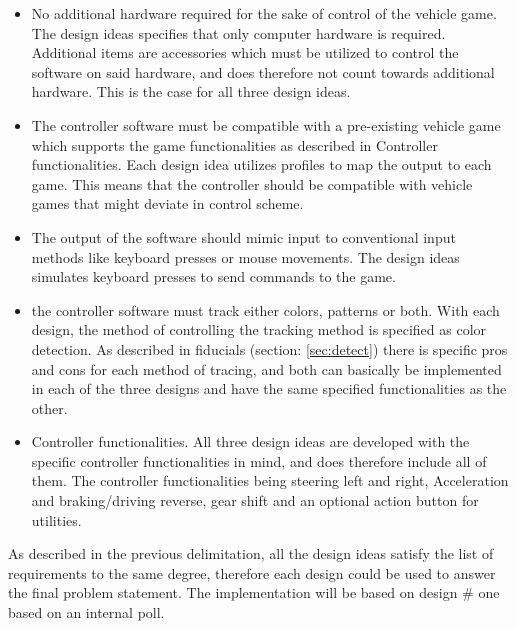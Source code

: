 \begin{itemize}
\item No additional hardware required for the sake of control of the vehicle game.\newline
The design ideas specifies that only computer hardware is required. Additional items are accessories which must be utilized to control the software on said hardware, and does therefore not count towards additional hardware. This is the case for all three design ideas.

\item The controller software must be compatible with a pre-existing vehicle game which supports
the game functionalities as described in Controller functionalities.\newline
Each design idea utilizes profiles to map the output to each game. This means that the controller should be compatible with vehicle games that might deviate in control scheme.

\item The output of the software should mimic input to conventional input methods like keyboard
presses or mouse movements.\newline
The design ideas simulates keyboard presses to send commands to the game. 

\item the controller software must track either colors, patterns or both.\newline
With each design, the method of controlling the tracking method is specified as color detection. As described in fiducials (section: \ref{sec:detect}) there is specific pros and cons for each method of tracing, and both can basically be implemented in each of the three designs and have the same specified functionalities as the other.

\item Controller functionalities.\newline
All three design ideas are developed with the specific controller functionalities in mind, and does therefore include all of them. The controller functionalities being steering left and right, Acceleration and braking/driving reverse, gear shift and an optional action button for utilities.

\end{itemize}

As described in the previous delimitation, all the design ideas satisfy the list of requirements to the same degree, therefore each design could be used to answer the final problem statement. The implementation will be based on design \# one based on an internal poll.

